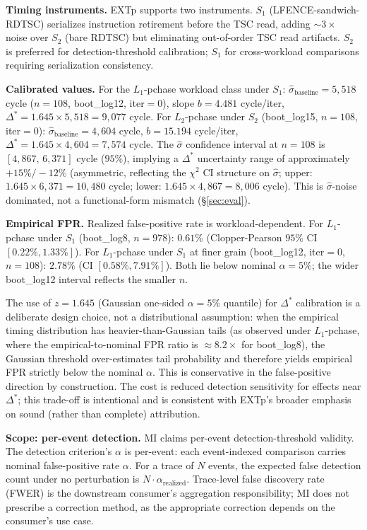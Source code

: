 \documentclass[conference]{IEEEtran}
\newcommand{\sigbase}{\hat{\sigma}_\text{baseline}}
\newcommand{\Dstar}{\Delta^{*}}
\newcommand{\arealized}{\alpha_\text{realized}}
\begin{document}
\textbf{Timing instruments.} EXTp supports two instruments. $S_1$
(LFENCE-sandwich-RDTSC) serializes instruction retirement before the
TSC read, adding ${\sim}3\times$ noise over $S_2$ (bare RDTSC) but
eliminating out-of-order TSC read artifacts. $S_2$ is preferred for
detection-threshold calibration; $S_1$ for cross-workload
comparisons requiring serialization consistency.

\textbf{Calibrated values.} For the $L_1$-pchase workload class
under $S_1$: $\sigbase = 5{,}518$ cycle ($n{=}108$,
boot\_log12, iter$=0$), slope $b = 4.481$ cycle/iter, $\Dstar =
1.645 \times 5{,}518 = 9{,}077$ cycle. For $L_2$-pchase under $S_2$
(boot\_log15, $n{=}108$, iter$=0$): $\sigbase = 4{,}604$ cycle,
$b = 15.194$ cycle/iter, $\Dstar = 1.645 \times 4{,}604 = 7{,}574$
cycle. The $\hat{\sigma}$ confidence interval at $n{=}108$ is
$[4{,}867,\, 6{,}371]$ cycle ($95\%$), implying a $\Dstar$
uncertainty range of approximately $+15\%/{-}12\%$ (asymmetric,
reflecting the $\chi^2$ CI structure on $\hat{\sigma}$; upper:
$1.645 \times 6{,}371 = 10{,}480$ cycle; lower: $1.645 \times 4{,}867
= 8{,}006$ cycle). This is $\hat{\sigma}$-noise dominated, not a
functional-form mismatch (\S\ref{sec:eval}).

\textbf{Empirical FPR.} Realized false-positive rate is
workload-dependent. For $L_1$-pchase under $S_1$ (boot\_log8,
$n{=}978$): $0.61\%$ (Clopper-Pearson $95\%$ CI
$[0.22\%, 1.33\%]$). For $L_1$-pchase under $S_1$ at finer grain
(boot\_log12, iter$=0$, $n{=}108$): $2.78\%$ (CI
$[0.58\%, 7.91\%]$). Both lie below nominal $\alpha{=}5\%$; the
wider boot\_log12 interval reflects the smaller $n$.

The use of $z = 1.645$ (Gaussian one-sided $\alpha{=}5\%$
quantile) for $\Dstar$ calibration is a deliberate design choice,
not a distributional assumption: when the empirical timing
distribution has heavier-than-Gaussian tails (as observed under
$L_1$-pchase, where the empirical-to-nominal FPR ratio is
${\approx}8.2{\times}$ for boot\_log8), the Gaussian threshold
over-estimates tail probability and therefore yields empirical
FPR strictly below the nominal $\alpha$. This is conservative in
the false-positive direction by construction. The cost is reduced
detection sensitivity for effects near $\Dstar$; this trade-off
is intentional and is consistent with EXTp's broader emphasis on
sound (rather than complete) attribution.

\textbf{Scope: per-event detection.} MI claims per-event
detection-threshold validity. The detection criterion's $\alpha$ is
per-event: each event-indexed comparison carries nominal
false-positive rate $\alpha$. For a trace of $N$ events, the
expected false detection count under no perturbation is
$N \cdot \arealized$. Trace-level false discovery rate (FWER) is the
downstream consumer's aggregation responsibility; MI does not
prescribe a correction method, as the appropriate correction depends
on the consumer's use case.
\end{document}
